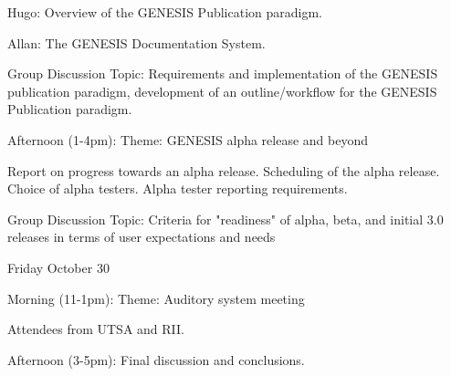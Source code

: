 \documentclass[12pt]{article}
\begin{document}
Hugo: Overview of the GENESIS Publication paradigm.

Allan: The GENESIS Documentation System.

Group Discussion
Topic: Requirements and implementation of the GENESIS publication paradigm, development of an outline/workflow for the GENESIS Publication paradigm.

Afternoon (1-4pm):
Theme: GENESIS alpha release and beyond

Report on progress towards an alpha release.
Scheduling of the alpha release.
Choice of alpha testers.
Alpha tester reporting requirements.

Group Discussion
Topic: Criteria for "readiness" of alpha, beta, and initial 3.0 releases in terms of user expectations and needs

Friday October 30

Morning (11-1pm):
Theme: Auditory system meeting

Attendees from UTSA and RII.

Afternoon (3-5pm):
Final discussion and conclusions.
\end{document}
